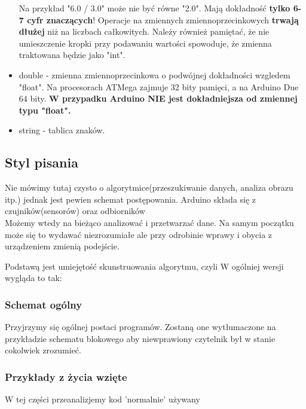 \begin{itemize}
				Na przykład "6.0 / 3.0" może nie być równe "2.0". Mają dokładność \textbf{tylko 6-7 cyfr znaczących}! Operacje na zmiennych zmiennoprzecinkowych \textbf{trwają dłużej} niż na liczbach całkowitych.
				Należy również pamiętać, że nie umieszczenie kropki przy podawaniu wartości spowoduje, że zmienna traktowana będzie jako "int".
			\item double - zmienna zmiennoprzecinkowa o podwójnej dokładności wzgledem "float". Na procesorach ATMega zajmuje 32 bity pamięci, a na Arduino Due 64 bity.
				\textbf{W przypadku Arduino NIE jest dokładniejsza od zmiennej typu "float".}
			\item string - tablica znaków. 

		\end{itemize}
%	  


	\subsection {Styl pisania}
	Nie mówimy tutaj czysto o algorytmice(przeszukiwanie danych, analiza obrazu itp.) jednak jest pewien schemat postępowania. Arduino składa się z czujników(sensorów) oraz odbiorników %
	\\
	Możemy wtedy na bieżąco analizować i przetwarzać dane. Na samym początku może się to wydawać niezrozumiałe ale przy odrobinie wprawy i obycia z urządzeniem zmienią podejście.
		
	Podstawą jest umiejętość skunstruowania algorytmu, czyli 
W ogólniej wersji wygląda to tak:
\subsubsection{Schemat ogólny}
	Przyjrzymy się ogólnej postaci programów. Zostaną one wytłumaczone na przykładzie schematu blokowego aby niewprawiony czytelnik był w stanie cokolwiek zrozumieć.
\subsubsection{Przykłady z życia wzięte}
W tej części przeanalizjemy kod 'normalnie' używany
